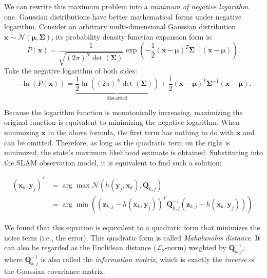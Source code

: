 We can rewrite this maximum problem into a \textit{minimum of negative logarithm} one. Gaussian distributions have better mathematical forms under negative logarithm. Consider an arbitrary multi-dimensional Gaussian distribution $\mathbf{x} \sim \mathcal{N}(\mathbf{\mu}, \boldsymbol{\Sigma})$, its probability density function expansion form is:
\begin{equation}
	P\left( \mathbf{x} \right) = \frac{1}{{\sqrt {{{(2\pi )}^N}\det (\boldsymbol{\Sigma} )} }}\exp \left( {-\frac{1}{2}{{\left( {\mathbf{x}-\mathbf{\mu}} \right)}^T}{ \boldsymbol{\Sigma} ^ {-1}}\left( {\mathbf{x}-\mathbf{\mu}} \right)} \right).
\end{equation}
Take the negative logarithm of both sides:
\begin{equation}
	-\ln \left( {P\left( \mathbf{x} \right)} \right) = \underbrace{\frac{1}{2}\ln \left( {{{\left( {2\pi} \right )}^N}\det \left( \boldsymbol{\Sigma} \right)} \right)}_{\text{discarded}} + \frac{1}{2}{\left( {\mathbf{x}-\mathbf{\mu}} \right)^T}{\boldsymbol{\Sigma} ^{-1}}\left( {\mathbf{x}-\mathbf{\mu}} \right).
\end{equation}

Because the logarithm function is monotonically increasing, maximizing the original function is equivalent to minimizing the negative logarithm. When minimizing $\mathbf{x}$ in the above formula, the first term has nothing to do with $\mathbf{x}$ and can be omitted. Therefore, as long as the quadratic term on the right is minimized, the state's maximum likelihood estimate is obtained. Substituting into the SLAM observation model, it is equivalent to find such a solution:

\begin{equation}
	\begin{aligned}
		(\mathbf{x}_k,\mathbf{y}_j)^* &= \arg \max \mathcal{N}(h(\mathbf{y}_j, \mathbf{x}_k), \mathbf{Q }_{k,j}) \\ &= \arg \min \left( {{{\left( {{ \mathbf{z}_{k,j}}-h\left( {{\mathbf{x }_k},{\mathbf{y}_j}} \right)} \right)}^T} \mathbf{Q}_{k,j}^{-1}\left( {{\mathbf{z}_{k,j}}-h\left( {{\mathbf{x}_k},{\mathbf{y}_j}} \right)} \right)} \right).
	\end{aligned}
\end{equation}

We found that this equation is equivalent to a quadratic form that minimizes the noise term (i.e., the error). This quadratic form is called \textit{Mahalanobis distance}. It can also be regarded as the Euclidean distance ($\mathcal{L}_2$-norm) weighted by $\mathbf{Q}_{k,j}^{-1}$, where $\mathbf{Q}_{k,j} ^{-1}$ is also called the \textit{information matrix}, which is exactly the \textit{inverse} of the Gaussian covariance matrix.

